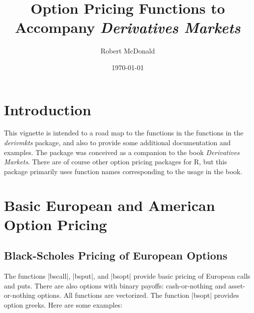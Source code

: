 \documentclass{article}\usepackage[]{graphicx}\usepackage[]{color}
\title{Option Pricing Functions to Accompany \emph{Derivatives Markets}}
\author{Robert McDonald}
\date{\today}
\begin{document}
\maketitle
\tableofcontents




\section{Introduction}

This vignette is intended to a road map to the functions in the
functions in the \emph{derivmkts} package, and also to provide some
additional documentation and examples. The package was conceived as a
companion to the book \emph{Derivatives Markets}. There are of course
other option pricing packages for R, but this package primarily uses
function names corresponding to the usage in the book.


\section{Basic European and American Option Pricing}

\subsection{Black-Scholes Pricing of European Options}

The functions |bscall|, |bsput|, and |bsopt| provide basic pricing of
European calls and puts. There are also options with binary payoffs:
cash-or-nothing and asset-or-nothing options. All functions are
vectorized. The function |bsopt| provides option greeks. Here are some
examples:
\end{document}
